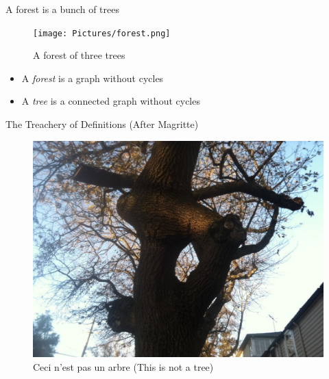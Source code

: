 \documentclass{beamer}
\begin{document}
\begin{frame}{A forest is a bunch of trees}
  \begin{figure}
            \texttt{[image: Pictures/forest.png]}
\caption{A forest of three trees}
  \end{figure}

  \begin{definition}\begin{itemize}
    \item A \emph{forest} is a graph without cycles
    \item A \emph{tree} is a connected graph without cycles
    \end{itemize}
  \end{definition}
\end{frame}

\begin{frame}{The Treachery of Definitions (After Magritte)}
  \begin{figure}
    \includegraphics[width=.85\textwidth]{Pictures/NotATree.jpg}
    \caption{Ceci n'est pas un arbre  (This is not a tree)} 
\end{figure}
\end{frame}
\end{document}
